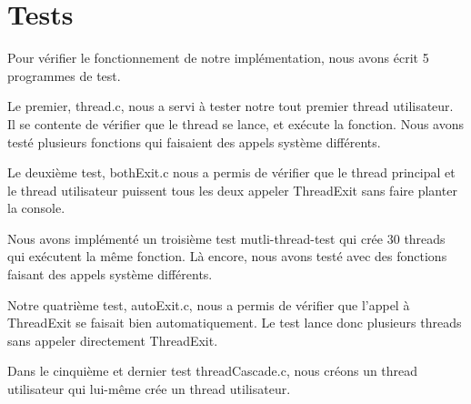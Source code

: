 \documentclass[10pt]{article}
\begin{document}
\section {Tests}

Pour vérifier le fonctionnement de notre implémentation, nous avons écrit 5 programmes de test.

Le premier, thread.c, nous a servi à tester notre tout premier thread utilisateur. Il se contente de vérifier que le thread se lance, et exécute la fonction. Nous avons testé plusieurs fonctions qui faisaient des appels système différents.

Le deuxième test, bothExit.c nous a permis de vérifier que le thread principal et le thread utilisateur puissent tous les deux appeler ThreadExit sans faire planter la console.

Nous avons implémenté un troisième test mutli-thread-test qui crée 30 threads qui exécutent la même fonction. Là encore, nous avons testé avec des fonctions faisant des appels système différents.

Notre quatrième test, autoExit.c, nous a permis de vérifier que l'appel à ThreadExit se faisait bien automatiquement. Le test lance donc plusieurs threads sans appeler directement ThreadExit.

Dans le cinquième et dernier test threadCascade.c, nous créons un thread utilisateur qui lui-même crée un thread utilisateur.
\end{document}
